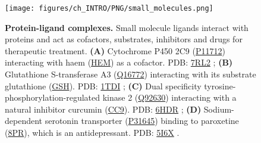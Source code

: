 \begin{figure}[htb!]
    \centering
    \texttt{[image: figures/ch\_INTRO/PNG/small\_molecules.png]}
    \caption[Protein-ligand complexes]{\textbf{Protein-ligand complexes.} Small molecule ligands interact with proteins and act as cofactors, substrates, inhibitors and drugs for therapeutic treatment. \textbf{(A)} Cytochrome P450 2C9 (\href{https://www.uniprot.org/uniprotkb/P11712/entry}{P11712}) interacting with haem (\href{https://www.ebi.ac.uk/pdbe-srv/pdbechem/chemicalCompound/show/HEM}{HEM}) as a cofactor. PDB: \href{https://www.ebi.ac.uk/pdbe/entry/pdb/7RL2}{7RL2} \cite{PARIKH_2021_CYTOP450}; \textbf{(B)} Glutathione S-transferase A3 (\href{https://www.uniprot.org/uniprotkb/Q16772/entry}{Q16772}) interacting with its substrate glutathione (\href{https://www.ebi.ac.uk/pdbe-srv/pdbechem/chemicalCompound/show/GSH}{GSH}). PDB: \href{https://www.ebi.ac.uk/pdbe/entry/pdb/1tdi}{1TDI} \cite{GU_2004_GST}; \textbf{(C)} Dual specificity tyrosine-phosphorylation-regulated kinase 2 (\href{https://www.uniprot.org/uniprotkb/Q92630/entry}{Q92630}) interacting with a natural inhibitor curcumin (\href{https://www.ebi.ac.uk/pdbe-srv/pdbechem/chemicalCompound/show/CC9}{CC9}). PDB: \href{https://www.ebi.ac.uk/pdbe/entry/pdb/6hdr}{6HDR} \cite{PDB_6HDR}; \textbf{(D)} Sodium-dependent serotonin transporter (\href{https://www.uniprot.org/uniprotkb/P31645/entry}{P31645}) binding to paroxetine (\href{https://www.ebi.ac.uk/pdbe-srv/pdbechem/chemicalCompound/show/8PR}{8PR}), which is an antidepressant. PDB: \href{https://www.ebi.ac.uk/pdbe/entry/pdb/5i6x}{5I6X} \cite{COLEMAN_2016_PAROXETIN}.}
    \label{fig:small_molecules}
\end{figure}

